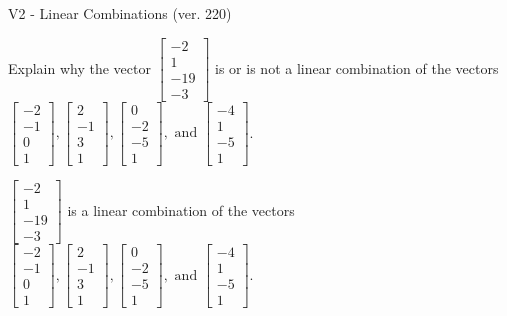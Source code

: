 \begin{exercise}
  \begin{exerciseTitle}V2 - Linear Combinations (ver. 220)\end{exerciseTitle}
  \begin{exerciseStatement}
    Explain why the vector \(\left[\begin{array}{c}
-2 \\
1 \\
-19 \\
-3
\end{array}\right]\)  is or is not a linear 
	combination of the vectors \(\left[\begin{array}{c}
-2 \\
-1 \\
0 \\
1
\end{array}\right] , \left[\begin{array}{c}
2 \\
-1 \\
3 \\
1
\end{array}\right] , \left[\begin{array}{c}
0 \\
-2 \\
-5 \\
1
\end{array}\right] , \text{ and } \left[\begin{array}{c}
-4 \\
1 \\
-5 \\
1
\end{array}\right]\).
	


  \end{exerciseStatement}
  \begin{exerciseAnswer}
   \(\left[\begin{array}{c}
-2 \\
1 \\
-19 \\
-3
\end{array}\right]\) 
  	 is  
	a linear combination of the vectors \(\left[\begin{array}{c}
-2 \\
-1 \\
0 \\
1
\end{array}\right] , \left[\begin{array}{c}
2 \\
-1 \\
3 \\
1
\end{array}\right] , \left[\begin{array}{c}
0 \\
-2 \\
-5 \\
1
\end{array}\right] , \text{ and } \left[\begin{array}{c}
-4 \\
1 \\
-5 \\
1
\end{array}\right]\).


\end{exerciseAnswer}
\end{exercise}
